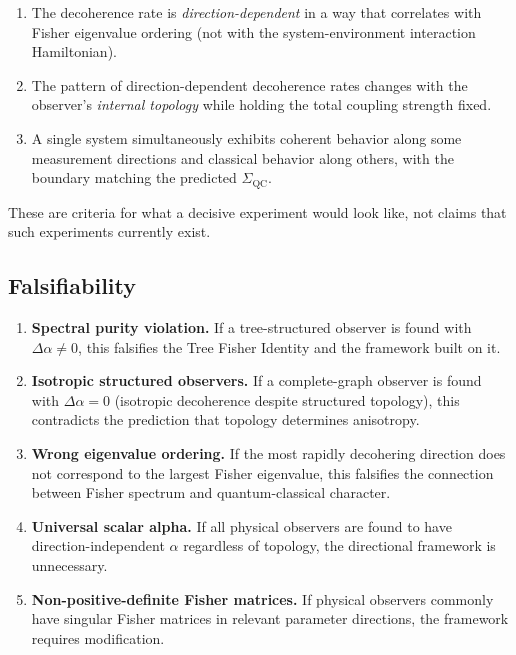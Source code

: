 \documentclass[11pt,a4paper]{article}
\theoremstyle{plain}
\theoremstyle{definition}
\newcommand{\SigmaQC}{\Sigma_{\mathrm{QC}}}
\begin{document}
\begin{enumerate}[label=(D\arabic*)]
\item The decoherence rate is \emph{direction-dependent} in a way
  that correlates with Fisher eigenvalue ordering (not with the
  system-environment interaction Hamiltonian).

\item The pattern of direction-dependent decoherence rates changes
  with the observer's \emph{internal topology} while holding the
  total coupling strength fixed.

\item A single system simultaneously exhibits coherent behavior
  along some measurement directions and classical behavior along
  others, with the boundary matching the predicted $\SigmaQC$.
\end{enumerate}

These are criteria for what a decisive experiment would look like,
not claims that such experiments currently exist.

\subsection{Falsifiability}

\begin{enumerate}[label=(F\arabic*)]
\item \textbf{Spectral purity violation.}  If a tree-structured
  observer is found with $\Delta\alpha \neq 0$, this falsifies
  the Tree Fisher Identity and the framework built on it.

\item \textbf{Isotropic structured observers.}  If a
  complete-graph observer is found with $\Delta\alpha = 0$
  (isotropic decoherence despite structured topology), this
  contradicts the prediction that topology determines anisotropy.

\item \textbf{Wrong eigenvalue ordering.}  If the most rapidly
  decohering direction does not correspond to the largest Fisher
  eigenvalue, this falsifies the connection between Fisher
  spectrum and quantum-classical character.

\item \textbf{Universal scalar alpha.}  If all physical observers
  are found to have direction-independent $\alpha$ regardless of
  topology, the directional framework is unnecessary.

\item \textbf{Non-positive-definite Fisher matrices.}  If
  physical observers commonly have singular Fisher matrices in
  relevant parameter directions, the framework requires
  modification.
\end{enumerate}
\end{document}
